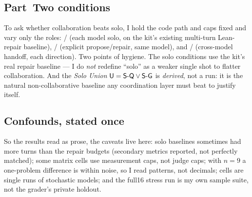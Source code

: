 \subsection{Part~Two conditions}
To ask whether collaboration beats solo, I hold the code path and caps fixed and
vary only the roles: \SQ/\SG{} (each model solo, on the kit's existing multi-turn
Lean-repair baseline), \RQ/\RG{} (explicit propose/repair, same model), and
\HQG/\HGQ{} (cross-model handoff, each direction). Two points of hygiene. The solo
conditions use the kit's real repair baseline --- I do \emph{not} redefine
``solo'' as a weaker single shot to flatter collaboration. And the \emph{Solo
Union} $\textsf{U} = \textsf{S-Q} \lor \textsf{S-G}$ is \emph{derived}, not a run: it is the natural
non-collaborative baseline any coordination layer must beat to justify itself.

\subsection{Confounds, stated once}
So the results read as prose, the caveats live here: solo baselines sometimes had
more turns than the repair budgets (secondary metrics reported, not perfectly
matched); some matrix cells use measurement caps, not judge caps; with $n=9$ a
one-problem difference is within noise, so I read patterns, not decimals; cells
are single runs of stochastic models; and the full16 stress run is my own sample
suite, not the grader's private holdout.
